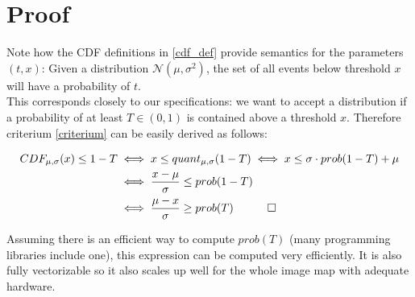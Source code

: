 \documentclass{article}
\numberwithin{equation}{section}
\begin{document}
\section{Proof}

Note how the CDF definitions in \ref{cdf_def} provide semantics for the parameters $(t, x)$: Given a distribution $\mathcal{N}(\mu, \sigma^2)$, the set of all events below threshold $x$ will have a probability of $t$.\\

This corresponds closely to our specifications: we want to accept a distribution if a probability of at least $T \in (0, 1)$ is contained above a threshold $x$. Therefore criterium \ref{criterium} can be easily derived as follows:

\begin{equation}
  \begin{aligned}
    CDF_{\mu, \sigma}(x) \leq 1 - T   &\iff   x \leq quant_{\mu, \sigma}(1 - T)   \iff   x \leq \sigma \cdot prob(1 - T) + \mu\\
    &\iff \frac{x - \mu}{\sigma} \leq prob(1 - T)\\
    &\iff \frac{\mu - x}{\sigma} \geq prob(T) \quad \qed\\
  \end{aligned}
\end{equation}

Assuming there is an efficient way to compute $prob(T)$ (many programming libraries include one), this expression can be computed very efficiently. It is also fully vectorizable so it also scales up well for the whole image map with adequate hardware.\\
\end{document}
